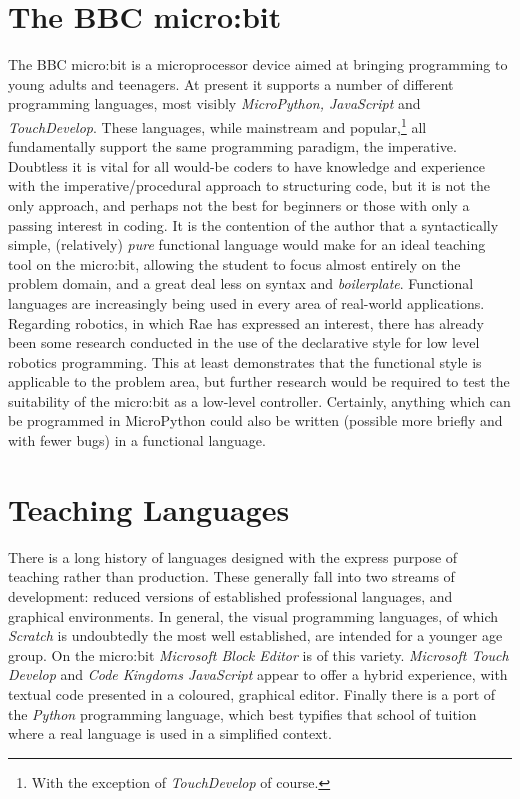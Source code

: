 \documentclass[12pt, a4paper]{report}
\begin{document}
\section{The BBC micro:bit} The BBC micro:bit is a microprocessor device aimed at
bringing programming to young adults and teenagers. At present it supports a number of different
programming languages, most visibly \textit{MicroPython, JavaScript} and \textit{TouchDevelop}.
These languages, while mainstream and popular,\footnote{With the exception of \textit{TouchDevelop}
of course.} all fundamentally support the same programming paradigm, the imperative. Doubtless it
is vital for all would-be coders to have knowledge and experience with the imperative/procedural
approach to structuring code, but it is not the only approach, and perhaps not the best for
beginners or those with only a passing interest in coding. It is the contention of the author that
a syntactically simple, (relatively) \textit{pure} functional language would make for an ideal
teaching tool on the micro:bit, allowing the student to focus almost entirely on the problem domain,
and a great deal less on syntax and \textit{boilerplate}. Functional languages are increasingly
being used in every area of real-world applications. Regarding robotics, in which Rae has expressed
an interest, there has already been some research conducted in the use of the declarative style
for low level robotics programming\cite{frob}. This at least demonstrates that the functional style
is applicable to the problem area, but further research would be required to test the suitability of
the micro:bit as a low-level controller. Certainly, anything which can be programmed in MicroPython
could also be written (possible more briefly and with fewer bugs) in a functional language.

\section{Teaching Languages}
There is a long history of languages designed with the express purpose of teaching rather than
production. These generally fall into two streams of development: reduced versions of established
professional languages, and graphical environments. In general, the visual programming languages, of
which \textit{Scratch} is undoubtedly the most well established, are intended for a younger age
group. On the micro:bit \textit{Microsoft Block Editor} is of this variety. 
\textit{Microsoft Touch Develop} and \textit{Code Kingdoms JavaScript} appear to offer a hybrid
experience, with textual code presented in a coloured, graphical editor. Finally there is a port of
the \textit{Python} programming language, which best typifies that school of tuition where a real
language is used in a simplified context.
\end{document}
